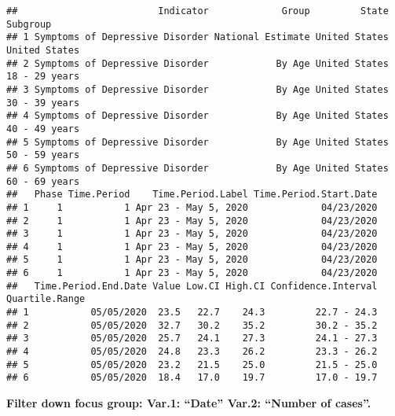 \documentclass[
]{article}
\newenvironment{Shaded}{\begin{snugshade}}{\end{snugshade}}
\newcommand{\DecValTok}[1]{\textcolor[rgb]{0.00,0.00,0.81}{#1}}
\newcommand{\FunctionTok}[1]{\textcolor[rgb]{0.00,0.00,0.00}{#1}}
\newcommand{\NormalTok}[1]{#1}
\newcommand{\OtherTok}[1]{\textcolor[rgb]{0.56,0.35,0.01}{#1}}
\newcommand{\SpecialCharTok}[1]{\textcolor[rgb]{0.00,0.00,0.00}{#1}}
\newcommand{\StringTok}[1]{\textcolor[rgb]{0.31,0.60,0.02}{#1}}
\begin{document}
\begin{verbatim}
##                         Indicator             Group         State      Subgroup
## 1 Symptoms of Depressive Disorder National Estimate United States United States
## 2 Symptoms of Depressive Disorder            By Age United States 18 - 29 years
## 3 Symptoms of Depressive Disorder            By Age United States 30 - 39 years
## 4 Symptoms of Depressive Disorder            By Age United States 40 - 49 years
## 5 Symptoms of Depressive Disorder            By Age United States 50 - 59 years
## 6 Symptoms of Depressive Disorder            By Age United States 60 - 69 years
##   Phase Time.Period    Time.Period.Label Time.Period.Start.Date
## 1     1           1 Apr 23 - May 5, 2020             04/23/2020
## 2     1           1 Apr 23 - May 5, 2020             04/23/2020
## 3     1           1 Apr 23 - May 5, 2020             04/23/2020
## 4     1           1 Apr 23 - May 5, 2020             04/23/2020
## 5     1           1 Apr 23 - May 5, 2020             04/23/2020
## 6     1           1 Apr 23 - May 5, 2020             04/23/2020
##   Time.Period.End.Date Value Low.CI High.CI Confidence.Interval Quartile.Range
## 1           05/05/2020  23.5   22.7    24.3         22.7 - 24.3               
## 2           05/05/2020  32.7   30.2    35.2         30.2 - 35.2               
## 3           05/05/2020  25.7   24.1    27.3         24.1 - 27.3               
## 4           05/05/2020  24.8   23.3    26.2         23.3 - 26.2               
## 5           05/05/2020  23.2   21.5    25.0         21.5 - 25.0               
## 6           05/05/2020  18.4   17.0    19.7         17.0 - 19.7
\end{verbatim}

\textbf{Filter down focus group: Var.1: ``Date'' Var.2: ``Number of
cases''.}

\begin{Shaded}
\end{Shaded}
\end{document}
